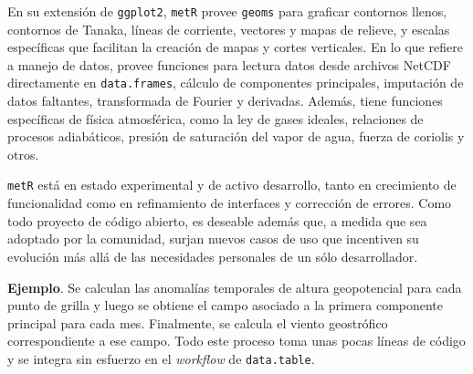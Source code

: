 \documentclass[runningheads,13pt]{llncs}\usepackage{knitr}
\newcommand{\mytilde}{\lower.80ex\hbox{\char`\~}\xspace}
\begin{document}
En su extensión de \texttt{ggplot2}, \texttt{metR} provee \texttt{geoms} para graficar contornos llenos, contornos de Tanaka, líneas de corriente, vectores y mapas de relieve, y escalas específicas que facilitan la creación de mapas y cortes verticales. En lo que refiere a manejo de datos, provee funciones para lectura datos desde archivos NetCDF directamente en \texttt{data.frames}, cálculo de componentes principales, imputación de datos faltantes, transformada de Fourier y derivadas. Además, tiene funciones específicas de física atmosférica, como la ley de gases ideales, relaciones de procesos adiabáticos, presión de saturación del vapor de agua, fuerza de coriolis y otros.

\texttt{metR} está en estado experimental y de activo desarrollo, tanto en crecimiento de funcionalidad como en refinamiento de interfaces y corrección de errores. Como todo proyecto de código abierto, es deseable además que, a medida que sea adoptado por la comunidad, surjan nuevos casos de uso que incentiven su evolución más allá de las necesidades personales de un sólo desarrollador.

\textbf{Ejemplo}. Se calculan las anomalías temporales de altura geopotencial para cada punto de grilla y luego se obtiene el campo asociado a la primera componente principal para cada mes. Finalmente, se calcula el viento geostrófico correspondiente a ese campo. Todo este proceso toma unas pocas líneas de código y se integra sin esfuerzo en el \emph{workflow} de \texttt{data.table}. 

\begin{knitrout}
\color{fgcolor}\begin{kframe}
\begin{alltt}
\hlstd{geopotential[, gh.t} \hlkwb{:=}   \hlstd{=}  \hlstd{(date))]}
\hlstd{geopotential[, gh.t.w} \hlkwb{:=} \hlopt{*}\hlstd{(}\hlopt{*}\hlopt{/}\hlstd{))]}
 \hlkwb{<-} \hlstd{geopotential[,}  \hlopt{\mytilde}  \hlopt{|}  \hlopt{+}   \hlstd{=} \hlstd{)}\hlopt{$}
                     \hlstd{=} \hlstd{(date)]}
\hlstd{eof[,} \hlstd{(}\hlstd{,} \hlstd{)} \hlkwb{:=}   \hlstd{= month]}
\end{alltt}
\end{kframe}
\end{knitrout}
\end{document}
